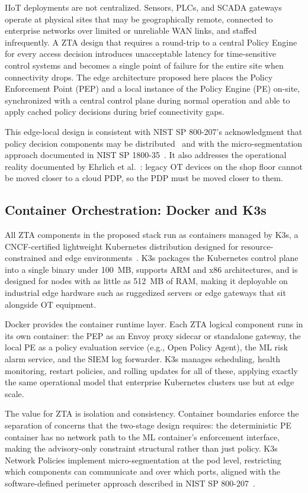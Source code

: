 \documentclass[conference]{IEEEtran}
\begin{document}
IIoT deployments are not centralized. Sensors, PLCs, and SCADA gateways operate at physical sites that may be geographically remote, connected to enterprise networks over limited or unreliable WAN links, and staffed infrequently. A ZTA design that requires a round-trip to a central Policy Engine for every access decision introduces unacceptable latency for time-sensitive control systems and becomes a single point of failure for the entire site when connectivity drops. The edge architecture proposed here places the Policy Enforcement Point (PEP) and a local instance of the Policy Engine (PE) on-site, synchronized with a central control plane during normal operation and able to apply cached policy decisions during brief connectivity gaps.

This edge-local design is consistent with NIST SP 800-207's acknowledgment that policy decision components may be distributed~\cite{nist800207} and with the micro-segmentation approach documented in NIST SP 1800-35~\cite{nist180035}. It also addresses the operational reality documented by Ehrlich et al.~\cite{ehrlich2021}: legacy OT devices on the shop floor cannot be moved closer to a cloud PDP, so the PDP must be moved closer to them.

\subsection{Container Orchestration: Docker and K3s}

All ZTA components in the proposed stack run as containers managed by K3s, a CNCF-certified lightweight Kubernetes distribution designed for resource-constrained and edge environments~\cite{k3s2024}. K3s packages the Kubernetes control plane into a single binary under 100~MB, supports ARM and x86 architectures, and is designed for nodes with as little as 512~MB of RAM, making it deployable on industrial edge hardware such as ruggedized servers or edge gateways that sit alongside OT equipment.

Docker provides the container runtime layer. Each ZTA logical component runs in its own container: the PEP as an Envoy proxy sidecar or standalone gateway, the local PE as a policy evaluation service (e.g., Open Policy Agent), the ML risk alarm service, and the SIEM log forwarder. K3s manages scheduling, health monitoring, restart policies, and rolling updates for all of these, applying exactly the same operational model that enterprise Kubernetes clusters use but at edge scale.

The value for ZTA is isolation and consistency. Container boundaries enforce the separation of concerns that the two-stage design requires: the deterministic PE container has no network path to the ML container's enforcement interface, making the advisory-only constraint structural rather than just policy. K3s Network Policies implement micro-segmentation at the pod level, restricting which components can communicate and over which ports, aligned with the software-defined perimeter approach described in NIST SP 800-207~\cite{nist800207}.
\end{document}
